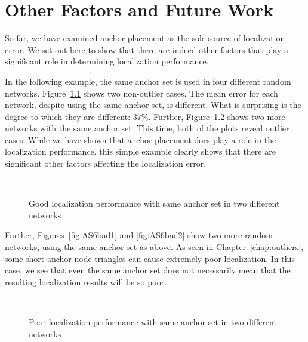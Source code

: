 \chapter{Other Factors and Future Work}
\label{sec:otherfactors}

So far, we have examined anchor placement as the sole source of localization error.  We set out here to show that there are indeed other factors that play a significant role in determining localization performance.

In the following example, the same anchor set is used in four different random networks.  Figure~\ref{fig:AS6good} shows two non-outlier cases.  The mean error for each network, despite using the same anchor set, is different.  What is surprising is the degree to which they are different: 37\%.  Further, Figure~\ref{fig:AS6bad} shows two more networks with the same anchor set.  This time, both of the plots reveal outlier cases.  While we have shown that anchor placement does play a role in the localization performance, this simple example clearly shows that there are significant other factors affecting the localization error.

\begin{figure}
  \centering
	\\
	\caption{Good localization performance with same anchor set in two different networks}
	\label{fig:AS6good}
\end{figure}

Further, Figures~\ref{fig:AS6bad1} and \ref{fig:AS6bad2} show two more random networks, using the same anchor set as above.  As seen in Chapter~\ref{chap:outliers}, some short anchor node triangles can cause extremely poor localization.  In this case, we see that even the same anchor set does not necessarily mean that the resulting localization results will be so poor.  

\begin{figure}
  \centering
\\
    \caption{Poor localization performance with same anchor set in two different networks}
	\label{fig:AS6bad}
\end{figure}

